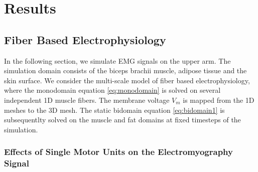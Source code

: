 \chapter{Results}\label{sec:results}






\section{Fiber Based Electrophysiology}

In the following section, we simulate EMG signals on the upper arm. The simulation domain consists of the biceps brachii muscle, adipose tissue and the skin surface. We consider the multi-scale model of fiber based electrophysiology, where the monodomain equation \cref{eq:monodomain} is solved on several independent 1D muscle fibers. The membrane voltage $V_m$ is mapped from the 1D meshes to the 3D mesh. The static bidomain equation \cref{eq:bidomain1} is subsequentlty solved on the muscle and fat domains at fixed timesteps of the simulation.

\subsection{Effects of Single Motor Units on the Electromyography Signal}

